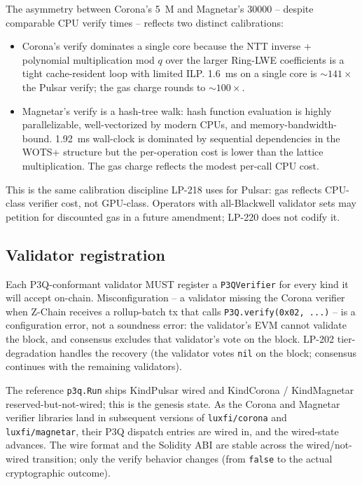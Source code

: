 The asymmetry between Corona's \SI{5}{M} and Magnetar's
\SI{30000}{} -- despite comparable CPU verify times -- reflects
two distinct calibrations:

\begin{itemize}[leftmargin=2em,nosep]
\item Corona's verify dominates a single core because the NTT
  inverse + polynomial multiplication mod $q$ over the larger
  Ring-LWE coefficients is a tight cache-resident loop with
  limited ILP. \SI{1.6}{\milli\second} on a single core is
  $\sim$$141\times$ the Pulsar verify; the gas charge rounds
  to $\sim$$100\times$.
\item Magnetar's verify is a hash-tree walk: hash function
  evaluation is highly parallelizable, well-vectorized by
  modern CPUs, and memory-bandwidth-bound. \SI{1.92}{\milli\second}
  wall-clock is dominated by sequential dependencies in the
  WOTS+ structure but the per-operation cost is lower than the
  lattice multiplication. The gas charge reflects the modest
  per-call CPU cost.
\end{itemize}

This is the same calibration discipline LP-218 uses for Pulsar:
gas reflects CPU-class verifier cost, not GPU-class. Operators
with all-Blackwell validator sets may petition for discounted
gas in a future amendment; LP-220 does not codify it.

\subsection{Validator registration}

Each P3Q-conformant validator MUST register a
\texttt{P3QVerifier} for every kind it will accept on-chain.
Misconfiguration -- a validator missing the Corona verifier
when Z-Chain receives a rollup-batch tx that calls
\texttt{P3Q.verify(0x02, ...)} -- is a configuration error, not
a soundness error: the validator's EVM cannot validate the
block, and consensus excludes that validator's vote on the
block. LP-202 tier-degradation handles the recovery (the
validator votes \texttt{nil} on the block; consensus continues
with the remaining validators).

The reference \texttt{p3q.Run} ships KindPulsar wired and
KindCorona / KindMagnetar reserved-but-not-wired; this is the
genesis state. As the Corona and Magnetar verifier libraries
land in subsequent versions of \texttt{luxfi/corona} and
\texttt{luxfi/magnetar}, their P3Q dispatch entries are wired
in, and the wired-state advances. The wire format and the
Solidity ABI are stable across the wired/not-wired transition;
only the verify behavior changes (from \texttt{false} to the
actual cryptographic outcome).

